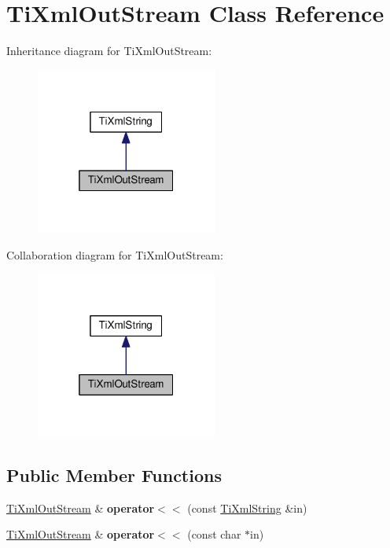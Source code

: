 \hypertarget{classTiXmlOutStream}{}\section{Ti\+Xml\+Out\+Stream Class Reference}
\label{classTiXmlOutStream}


Inheritance diagram for Ti\+Xml\+Out\+Stream\+:\nopagebreak
\begin{figure}[H]
\begin{center}
\leavevmode
\includegraphics[width=169pt]{classTiXmlOutStream__inherit__graph}
\end{center}
\end{figure}


Collaboration diagram for Ti\+Xml\+Out\+Stream\+:\nopagebreak
\begin{figure}[H]
\begin{center}
\leavevmode
\includegraphics[width=169pt]{classTiXmlOutStream__coll__graph}
\end{center}
\end{figure}
\subsection*{Public Member Functions}
\begin{DoxyCompactItemize}
\item 
\hyperlink{classTiXmlOutStream}{Ti\+Xml\+Out\+Stream} \& {\bfseries operator$<$$<$} (const \hyperlink{classTiXmlString}{Ti\+Xml\+String} \&in)\hypertarget{classTiXmlOutStream_a3640dcb1c0903be3bc6966cdc9a79db6}{}\label{classTiXmlOutStream_a3640dcb1c0903be3bc6966cdc9a79db6}

\item 
\hyperlink{classTiXmlOutStream}{Ti\+Xml\+Out\+Stream} \& {\bfseries operator$<$$<$} (const char $\ast$in)\hypertarget{classTiXmlOutStream_af2117e5a8cbfcb69544804ad2859bfb6}{}\label{classTiXmlOutStream_af2117e5a8cbfcb69544804ad2859bfb6}

\end{DoxyCompactItemize}
